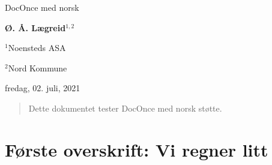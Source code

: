\documentclass[%
norsk,oneside,                 %
final,                   %
10pt]{article}
\begin{document}

\newcommand{\exercisesection}[1]{\subsection*{#1}}








\thispagestyle{empty}

\begin{center}
{\LARGE\bf
\begin{spacing}{1.25}
DocOnce med norsk
\end{spacing}
}
\end{center}


\begin{center}
{\bf Ø. Å. Lægreid${}^{1, 2}$} \\ [0mm]
\end{center}

\begin{center}
\centerline{{\small ${}^1$Noensteds ASA}}
\centerline{{\small ${}^2$Nord Kommune}}
\end{center}
    

\begin{center}
fredag, 02. juli, 2021
\end{center}

\vspace{1cm}



\begin{abstract}
Dette dokumentet tester DocOnce med norsk støtte.
\end{abstract}

\tableofcontents

\vspace{1cm} %

\section{Første overskrift: Vi regner litt}
\end{document}
